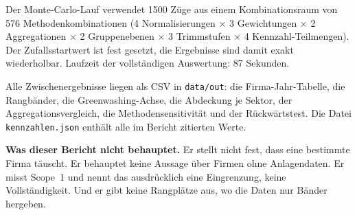 \documentclass[11pt,a4paper]{article}
\newcommand{\befund}[1]{%
  \par\vspace{2pt}\noindent\colorbox{softgrey}{%
  \begin{minipage}{\dimexpr\linewidth-2\fboxsep}\small\vspace{3pt}#1\vspace{3pt}\end{minipage}}\par\vspace{4pt}}
\begin{document}
Der Monte-Carlo-Lauf verwendet 1500 Züge aus einem Kombinationsraum von 576 Methodenkombinationen (4 Normalisierungen $\times$ 3 Gewichtungen $\times$ 2 Aggregationen $\times$ 2 Gruppenebenen $\times$ 3 Trimmstufen $\times$ 4 Kennzahl-Teilmengen). Der Zufallsstartwert ist fest gesetzt, die Ergebnisse sind damit exakt wiederholbar. Laufzeit der vollständigen Auswertung: 87 Sekunden.

Alle Zwischenergebnisse liegen als CSV in \texttt{data/out}: die Firma-Jahr-Tabelle, die Rangbänder, die Greenwashing-Achse, die Abdeckung je Sektor, der Aggregationsvergleich, die Methodensensitivität und der Rückwärtstest. Die Datei \texttt{kennzahlen.json} enthält alle im Bericht zitierten Werte.

\vfill
\befund{\textbf{Was dieser Bericht nicht behauptet.} Er stellt nicht fest, dass eine bestimmte Firma täuscht. Er behauptet keine Aussage über Firmen ohne Anlagendaten. Er misst Scope~1 und nennt das ausdrücklich eine Eingrenzung, keine Vollständigkeit. Und er gibt keine Rangplätze aus, wo die Daten nur Bänder hergeben.}
\end{document}
